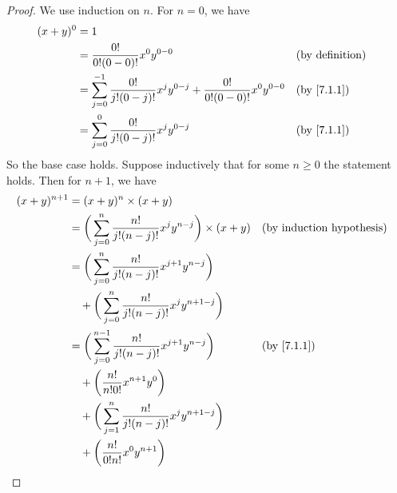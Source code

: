 \begin{proof}
  We use induction on \(n\).
  For \(n = 0\), we have
  \begin{align*}
    (x + y)^0 & = 1                                                                                                                         \\
              & = \dfrac{0!}{0!(0 - 0)!} x^0 y^{0 - 0}                                                          &  & \text{(by definition)} \\
              & = \sum_{j = 0}^{-1} \dfrac{0!}{j!(0 - j)!} x^j y^{0 - j} + \dfrac{0!}{0!(0 - 0)!} x^0 y^{0 - 0} &  & \by{7.1.1}             \\
              & = \sum_{j = 0}^0 \dfrac{0!}{j!(0 - j)!} x^j y^{0 - j}                                           &  & \by{7.1.1}
  \end{align*}
  So the base case holds.
  Suppose inductively that for some \(n \geq 0\) the statement holds.
  Then for \(n + 1\), we have
  \begin{align*}
    (x + y)^{n + 1} & = (x + y)^n \times (x + y)                                                                                                   \\
                    & = \bigg(\sum_{j = 0}^n \dfrac{n!}{j!(n - j)!} x^j y^{n - j}\bigg) \times (x + y)            &  & \byIH                       \\
                    & = \bigg(\sum_{j = 0}^n \dfrac{n!}{j!(n - j)!} x^{j + 1} y^{n - j}\bigg)                                                      \\
                    & \quad + \bigg(\sum_{j = 0}^n \dfrac{n!}{j!(n - j)!} x^j y^{n + 1 - j}\bigg)                                                  \\
                    & = \bigg(\sum_{j = 0}^{n - 1} \dfrac{n!}{j!(n - j)!} x^{j + 1} y^{n - j}\bigg)               &  & \by{7.1.1}                  \\
                    & \quad + \bigg(\dfrac{n!}{n!0!} x^{n + 1} y^0\bigg)                                                                           \\
                    & \quad + \bigg(\sum_{j = 1}^n \dfrac{n!}{j!(n - j)!} x^j y^{n + 1 - j}\bigg)                                                  \\
                    & \quad + \bigg(\dfrac{n!}{0!n!} x^0 y^{n + 1}\bigg)                                                                           \\

\end{align*}
\end{proof}
